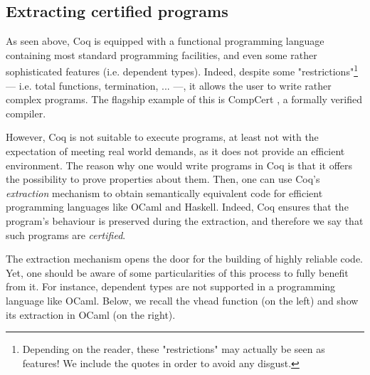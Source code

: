 	
\subsection{Extracting certified programs}	
\label{sub:coqextract}	
	

	As seen above, Coq is equipped with a functional programming language 	
	containing most standard programming facilities,  and even 
	some rather sophisticated features (i.e. dependent types). Indeed,
	despite some "restrictions"\footnote{Depending on the reader, these "restrictions" may actually
	be seen as features! We include the quotes in order to avoid any disgust.} 
	--- i.e. total functions, termination, ... ---, it allows the user to write rather complex programs. 
	The flagship example of	this is CompCert \cite{2006-Leroy-compcert}, a formally verified
	compiler.  	
	
	However, Coq is not suitable to execute programs, at least not with the expectation
	of meeting real world demands, as it does not provide an efficient environment. The reason
	why one would write programs in Coq is that it offers the possibility to prove properties
	about them. Then, one can use Coq's \textit{extraction} mechanism to obtain semantically equivalent
	code for efficient programming languages like OCaml and Haskell. Indeed, Coq
	ensures that the program's behaviour is preserved during the extraction, and therefore we say
	that such programs are \textit{certified}.
	
	The extraction mechanism opens the door for the building of highly reliable code. Yet, one
	should be aware of some particularities of this process to fully benefit from it. For instance,
	dependent types are not supported in a programming language like OCaml. Below, we
	recall the \textsf{vhead} function (on the left) and show its extraction in OCaml (on the right).	
	
	\begin{figure}[H]
	\begin{minipage}[b]{0.515\linewidth} 
	\centering
	
	\end{minipage}
	\hspace{0.05cm}
	\begin{minipage}[b]{0.5\linewidth} 
	\centering
	
	\end{minipage}
	\end{figure}	  		
	
